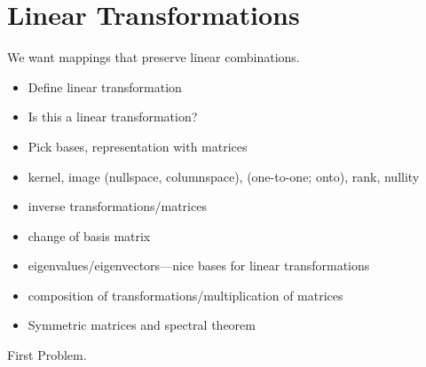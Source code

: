 \chapter{Linear Transformations}

We want mappings that preserve linear combinations.

\begin{itemize}
\item Define linear transformation
\item Is this a linear transformation?
\item Pick bases, representation with matrices
\item kernel, image (nullspace, columnspace), (one-to-one; onto),
  rank, nullity
\item inverse transformations/matrices
\item change of basis matrix
\item eigenvalues/eigenvectors---nice bases for linear transformations
\item composition of transformations/multiplication of matrices
\item Symmetric matrices and spectral theorem
\end{itemize}

\begin{problem}
  First Problem.
\end{problem}


